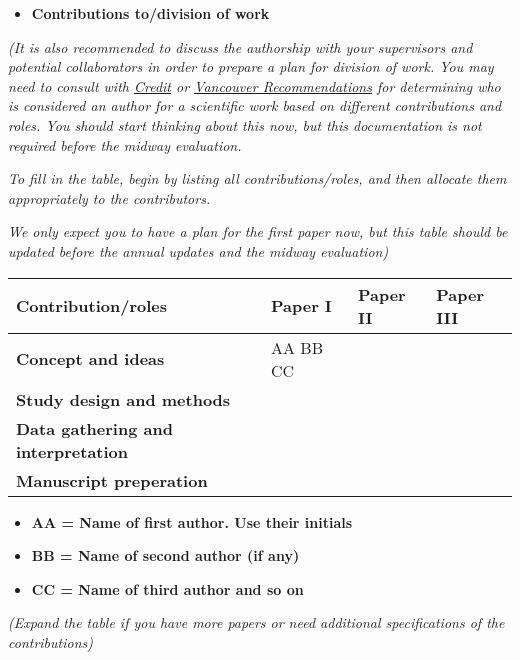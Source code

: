 \begin{itemize}
    \item \textbf{Contributions to/division of work}
\end{itemize}


\textit{(It is also recommended to discuss the authorship with your supervisors and potential collaborators in order to prepare a plan for division of work. You may need to consult with \href{https://www.casrai.org/credit.html}{Credit} or \href{https://www.icmje.org/icmje-recommendations.pdf}{Vancouver Recommendations} for determining who is considered an author for a scientific work based on different contributions and roles. You should start thinking about this now, but this documentation is not required before the midway evaluation.}

\textit{To fill in the table, begin by listing all contributions/roles, and then allocate them appropriately to the contributors.}

\textit{We only expect you to have a plan for the first paper now, but this table should be updated before the annual updates and the midway evaluation)}

%
%
\vspace{1cm}
\begin{tabularx}{\textwidth}{|X|l|l|l|}
    \hline
    \textbf{Contribution/roles} & \textbf{Paper I} & \textbf{Paper II} & \textbf{Paper III} \\
    \hline 
    \textbf{Concept and ideas} & AA BB CC & & \\
    \hline 
    \textbf{Study design and methods} & & & \\
    \hline
    \textbf{Data gathering and interpretation} & & & \\
    \hline 
    \textbf{Manuscript preperation} & & & \\
    \hline 
\end{tabularx}

\begin{itemize}
    \item \textbf{AA = Name of first author. Use their initials}
    \item \textbf{BB = Name of second author (if any)}
    \item \textbf{CC = Name of third author and so on}
\end{itemize}

\textit{(Expand the table if you have more papers or need additional specifications of the contributions)}